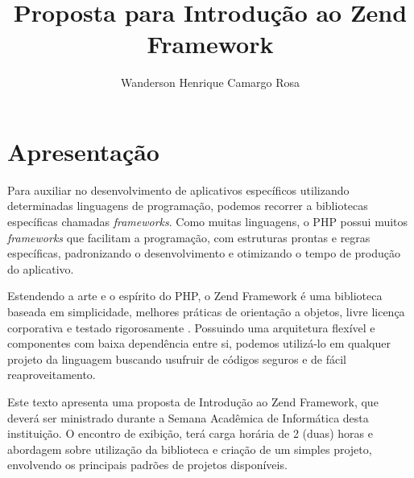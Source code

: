 \documentclass{article}
\title{Proposta para Introdução ao Zend Framework}
\author{Wanderson Henrique Camargo Rosa}
\begin{document}
\maketitle{}

\section{Apresentação}
\label{sec:apresentacao}

Para auxiliar no desenvolvimento de aplicativos específicos utilizando
determinadas linguagens de programação, podemos recorrer a bibliotecas
específicas chamadas \emph{frameworks}. Como muitas linguagens, o PHP possui
muitos \emph{frameworks} que facilitam a programação, com estruturas prontas e
regras específicas, padronizando o desenvolvimento e otimizando o tempo de
produção do aplicativo.

Estendendo a arte e o espírito do PHP, o Zend Framework é uma biblioteca
baseada em simplicidade, melhores práticas de orientação a objetos, livre
licença corporativa e testado rigorosamente \cite{zend}. Possuindo uma
arquitetura flexível e componentes com baixa dependência entre si, podemos
utilizá-lo em qualquer projeto da linguagem buscando usufruir de códigos seguros
e de fácil reaproveitamento.

Este texto apresenta uma proposta de Introdução ao Zend Framework, que deverá
ser ministrado durante a Semana Acadêmica de Informática desta instituição. O
encontro de exibição, terá carga horária de 2 (duas) horas e abordagem sobre
utilização da biblioteca e criação de um simples projeto, envolvendo os
principais padrões de projetos disponíveis.



\end{document}

